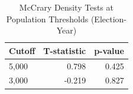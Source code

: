 \begin{table}[!h]
\centering
\caption{\label{tab:density}McCrary Density Tests at Population Thresholds (Election-Year)}
\centering
\begin{tabular}[t]{lrr}
\toprule
Cutoff & T-statistic & p-value\\
\midrule
5,000 & 0.798 & 0.425\\
3,000 & -0.219 & 0.827\\
\bottomrule
\end{tabular}
\end{table}
